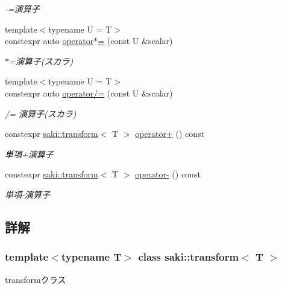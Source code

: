 \begin{DoxyCompactItemize}
\begin{DoxyCompactList}\small\item\em -\/=演算子 \end{DoxyCompactList}\item 
{\footnotesize template$<$typename U  = T$>$ }\\constexpr auto \mbox{\hyperlink{classsaki_1_1transform_a239258a92acd6ad904e8a5dea5cc78cf}{operator$\ast$=}} (const U \&scalar)
\begin{DoxyCompactList}\small\item\em $\ast$=演算子(スカラ) \end{DoxyCompactList}\item 
{\footnotesize template$<$typename U  = T$>$ }\\constexpr auto \mbox{\hyperlink{classsaki_1_1transform_a069699ce700d7a69503c17c78b58646e}{operator/=}} (const U \&scalar)
\begin{DoxyCompactList}\small\item\em /= 演算子(スカラ) \end{DoxyCompactList}\item 
constexpr \mbox{\hyperlink{classsaki_1_1transform}{saki\+::transform}}$<$ T $>$ \mbox{\hyperlink{classsaki_1_1transform_a67d95b1c1a7826256f06b1d1345474b5}{operator+}} () const
\begin{DoxyCompactList}\small\item\em 単項+演算子 \end{DoxyCompactList}\item 
constexpr \mbox{\hyperlink{classsaki_1_1transform}{saki\+::transform}}$<$ T $>$ \mbox{\hyperlink{classsaki_1_1transform_aba069deaa467ec2e4ea548b590084916}{operator-\/}} () const
\begin{DoxyCompactList}\small\item\em 単項-\/演算子 \end{DoxyCompactList}\end{DoxyCompactItemize}


\subsection{詳解}
\subsubsection*{template$<$typename T$>$\newline
class saki\+::transform$<$ T $>$}

transformクラス 

